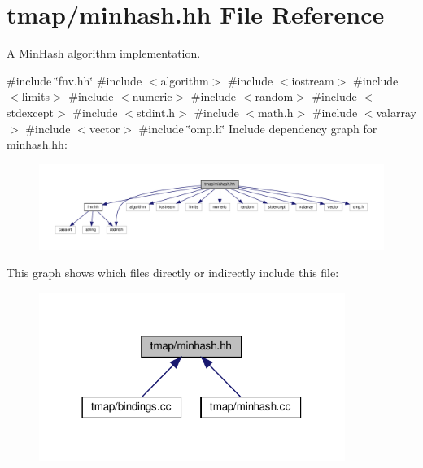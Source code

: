 \hypertarget{minhash_8hh}{}\section{tmap/minhash.hh File Reference}
\label{minhash_8hh}


A Min\+Hash algorithm implementation.  


{\ttfamily \#include \char`\"{}fnv.\+hh\char`\"{}}\newline
{\ttfamily \#include $<$algorithm$>$}\newline
{\ttfamily \#include $<$iostream$>$}\newline
{\ttfamily \#include $<$limits$>$}\newline
{\ttfamily \#include $<$numeric$>$}\newline
{\ttfamily \#include $<$random$>$}\newline
{\ttfamily \#include $<$stdexcept$>$}\newline
{\ttfamily \#include $<$stdint.\+h$>$}\newline
{\ttfamily \#include $<$math.\+h$>$}\newline
{\ttfamily \#include $<$valarray$>$}\newline
{\ttfamily \#include $<$vector$>$}\newline
{\ttfamily \#include \char`\"{}omp.\+h\char`\"{}}\newline
Include dependency graph for minhash.\+hh\+:\nopagebreak
\begin{figure}[H]
\begin{center}
\leavevmode
\includegraphics[width=350pt]{minhash_8hh__incl}
\end{center}
\end{figure}
This graph shows which files directly or indirectly include this file\+:\nopagebreak
\begin{figure}[H]
\begin{center}
\leavevmode
\includegraphics[width=282pt]{minhash_8hh__dep__incl}
\end{center}
\end{figure}
